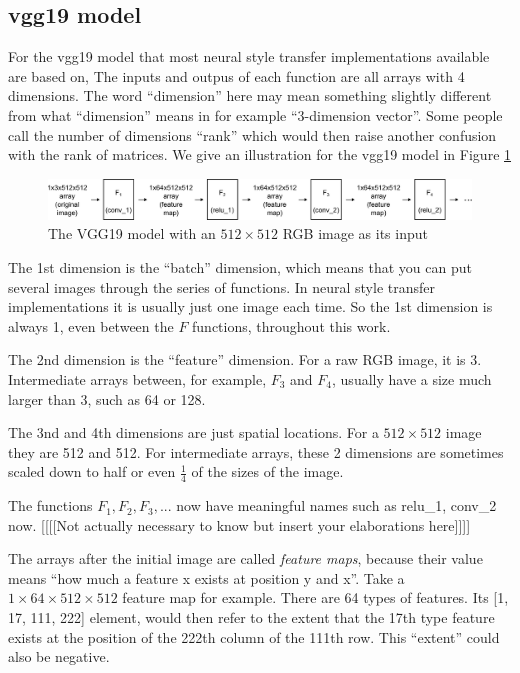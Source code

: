 \documentclass[runningheads]{llncs}
\begin{document}
\subsection{vgg19 model}
For the vgg19 model that most neural style transfer implementations available are based on,
The inputs and outpus of each function are all arrays with 4 dimensions.
The word ``dimension'' here may mean something slightly different from what ``dimension'' means in
for example ``$3$-dimension vector''. 
Some people call the number of dimensions ``rank'' which would then raise another confusion with the rank of matrices.
We give an illustration for the vgg19 model in Figure \ref{vgg512}
\begin{figure}
\center
\includegraphics[width=\textwidth]{vgg512.pdf}
\caption{The VGG19 model with an $512\times512$ RGB image as its input \label{vgg512}}
\end{figure}

The 1st dimension is the ``batch'' dimension, which means that you can put several images through the
series of functions.
In neural style transfer implementations it is usually just one image each time.
So the 1st dimension is always 1, even between the $F$ functions, throughout this work.

The 2nd dimension is the ``feature'' dimension. For a raw RGB image, it is 3.
Intermediate arrays between, for example, $F_3$ and $F_4$, usually 
have a size much larger than 3, such as 64 or 128.

The 3nd and 4th dimensions are just spatial locations. 
For a $512\times512$ image they are 512 and 512. 
For intermediate arrays, these 2 dimensions are sometimes scaled down
to half or even $\frac{1}{4}$ of the sizes of the image.

The functions $F_1,F_2,F_3,...$ now have meaningful names such as relu\_1, conv\_2 now.
[[[[Not actually necessary to know but insert your elaborations here]]]]

The arrays after the initial image are called \emph{feature maps}, because their value means
``how much a feature x exists at position y and x''.
Take a $1\times64\times512\times512$ feature map for example. There are 64 types of features.
Its [1, 17, 111, 222] element, would then refer to the extent that the 17th type feature exists
at the position of the 222th column of the 111th row. This ``extent'' could also be negative.
\end{document}
